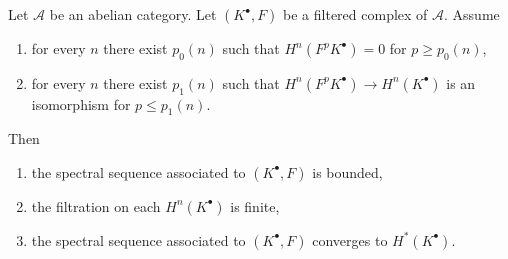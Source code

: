 \begin{lemma}
\label{lemma-ss-converges-trivial}
Let $\mathcal{A}$ be an abelian category. Let $(K^\bullet, F)$ be a
filtered complex of $\mathcal{A}$. Assume
\begin{enumerate}
\item for every $n$ there exist $p_0(n)$ such that
$H^n(F^pK^\bullet) = 0$ for $p \geq p_0(n)$,
\item for every $n$ there exist $p_1(n)$ such that
$H^n(F^pK^\bullet) \to H^n(K^\bullet)$ is an isomorphism
for $p \leq p_1(n)$.
\end{enumerate}
Then
\begin{enumerate}
\item the spectral sequence associated to $(K^\bullet, F)$ is bounded,
\item the filtration on each $H^n(K^\bullet)$ is finite,
\item the spectral sequence associated to $(K^\bullet, F)$ converges
to $H^*(K^\bullet)$.
\end{enumerate}
\end{lemma}

